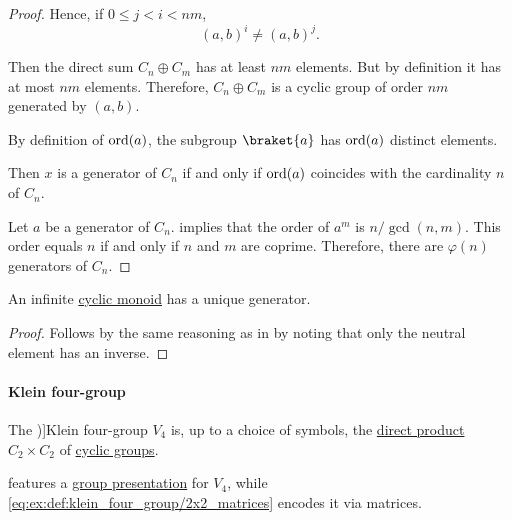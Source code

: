 \begin{proof}
  Hence, if \( 0 \leq j < i < nm \),
  \begin{equation*}
    (a, b)^i \neq (a, b)^j.
  \end{equation*}

  Then the direct sum \( C_n \oplus C_m \) has at least \( nm \) elements. But by definition it has at most \( nm \) elements. Therefore, \( C_n \oplus C_m \) is a cyclic group of order \( nm \) generated by \( (a, b) \).

   By definition of \( \operatorname{ord}(a) \), the subgroup \( \braket{ a } \) has \( \operatorname{ord}(a) \) distinct elements.

  Then \( x \) is a generator of \( C_n \) if and only if \( \operatorname{ord}(a) \) coincides with the cardinality \( n \) of \( C_n \).

   Let \( a \) be a generator of \( C_n \).  implies that the order of \( a^m \) is \( n / \gcd(n, m) \). This order equals \( n \) if and only if \( n \) and \( m \) are coprime. Therefore, there are \( \varphi(n) \) generators of \( C_n \).
\end{proof}

\begin{corollary}\label{thm:infinite_cyclic_monoid_generator}
  An infinite \hyperref[def:cyclic_monoid]{cyclic monoid} has a unique generator.
\end{corollary}
\begin{proof}
  Follows by the same reasoning as in  by noting that only the neutral element has an inverse.
\end{proof}

\paragraph{Klein four-group}

\begin{definition}\label{def:klein_four_group}
  The \term[ru=четверная группа Клейна (\cite[189]{Винберг2014КурсАлгебры})]{Klein four-group} \( V_4 \) is, up to a choice of symbols, the \hyperref[def:first_order_direct_product]{direct product} \( C_2 \times C_2 \) of \hyperref[def:cyclic_group]{cyclic groups}.
\end{definition}
\begin{comments}
  \item {} features a \hyperref[def:group_presentation]{group presentation} for \( V_4 \), while \eqref{eq:ex:def:klein_four_group/2x2_matrices} encodes it via matrices.
\end{comments}

